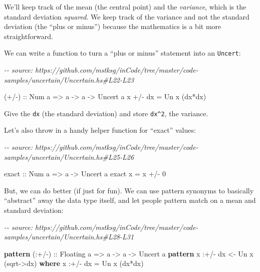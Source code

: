 \documentclass[]{article}
\newenvironment{Shaded}{}{}
\newcommand{\CommentTok}[1]{\textcolor[rgb]{0.38,0.63,0.69}{\textit{#1}}}
\newcommand{\DataTypeTok}[1]{\textcolor[rgb]{0.56,0.13,0.00}{#1}}
\newcommand{\DecValTok}[1]{\textcolor[rgb]{0.25,0.63,0.44}{#1}}
\newcommand{\FunctionTok}[1]{\textcolor[rgb]{0.02,0.16,0.49}{#1}}
\newcommand{\KeywordTok}[1]{\textcolor[rgb]{0.00,0.44,0.13}{\textbf{#1}}}
\newcommand{\NormalTok}[1]{#1}
\newcommand{\OperatorTok}[1]{\textcolor[rgb]{0.40,0.40,0.40}{#1}}
\newcommand{\OtherTok}[1]{\textcolor[rgb]{0.00,0.44,0.13}{#1}}
\begin{document}
We'll keep track of the mean (the central point) and the \emph{variance}, which
is the standard deviation \emph{squared}. We keep track of the variance and not
the standard deviation (the ``plus or minus'') because the mathematics is a bit
more straightforward.

We can write a function to turn a ``plus or minus'' statement into an
\texttt{Uncert}:

\begin{Shaded}
\begin{Highlighting}[]
\CommentTok{{-}{-} source: https://github.com/mstksg/inCode/tree/master/code{-}samples/uncertain/Uncertain.hs\#L22{-}L23}

\OtherTok{(+/{-}) ::} \DataTypeTok{Num}\NormalTok{ a }\OtherTok{=>}\NormalTok{ a }\OtherTok{{-}>}\NormalTok{ a }\OtherTok{{-}>} \DataTypeTok{Uncert}\NormalTok{ a}
\NormalTok{x }\OperatorTok{+/{-}}\NormalTok{ dx }\OtherTok{=} \DataTypeTok{Un}\NormalTok{ x (dx}\OperatorTok{*}\NormalTok{dx)}
\end{Highlighting}
\end{Shaded}

Give the \texttt{dx} (the standard deviation) and store \texttt{dx\^{}2}, the
variance.

Let's also throw in a handy helper function for ``exact'' values:

\begin{Shaded}
\begin{Highlighting}[]
\CommentTok{{-}{-} source: https://github.com/mstksg/inCode/tree/master/code{-}samples/uncertain/Uncertain.hs\#L25{-}L26}

\OtherTok{exact ::} \DataTypeTok{Num}\NormalTok{ a }\OtherTok{=>}\NormalTok{ a }\OtherTok{{-}>} \DataTypeTok{Uncert}\NormalTok{ a}
\NormalTok{exact x }\OtherTok{=}\NormalTok{ x }\OperatorTok{+/{-}} \DecValTok{0}
\end{Highlighting}
\end{Shaded}

But, we can do better (if just for fun). We can use pattern synonyms to
basically ``abstract'' away the data type itself, and let people pattern match
on a mean and standard deviation:

\begin{Shaded}
\begin{Highlighting}[]
\CommentTok{{-}{-} source: https://github.com/mstksg/inCode/tree/master/code{-}samples/uncertain/Uncertain.hs\#L28{-}L31}

\KeywordTok{pattern}\OtherTok{ (:+/{-}) ::} \DataTypeTok{Floating}\NormalTok{ a }\OtherTok{=>}\NormalTok{ a }\OtherTok{{-}>}\NormalTok{ a }\OtherTok{{-}>} \DataTypeTok{Uncert}\NormalTok{ a}
\KeywordTok{pattern}\NormalTok{ x }\OperatorTok{:+/{-}}\NormalTok{ dx }\OtherTok{<{-}} \DataTypeTok{Un}\NormalTok{ x (}\FunctionTok{sqrt}\OtherTok{{-}>}\NormalTok{dx)}
  \KeywordTok{where}
\NormalTok{    x }\OperatorTok{:+/{-}}\NormalTok{ dx }\OtherTok{=} \DataTypeTok{Un}\NormalTok{ x (dx}\OperatorTok{*}\NormalTok{dx)}
\end{Highlighting}
\end{Shaded}
\end{document}
